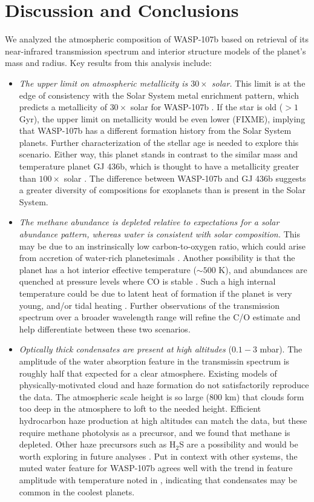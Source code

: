\documentclass[twocolumn]{aastex61}
\begin{document}
\section{Discussion and Conclusions} \label{sec:discuss}
We analyzed the atmospheric composition of WASP-107b based on retrieval of its near-infrared transmission spectrum and interior structure models of the planet's mass and radius.  Key results from this analysis include:

\begin{itemize}
\item{\emph{The upper limit on atmospheric metallicity is $30\times$ solar.} This limit is at the edge of consistency with the Solar System metal enrichment pattern, which predicts a metallicity of $30\times$ solar for WASP-107b \citep{kreidberg14b}.  If the star is old ($>1$ Gyr), the upper limit on metallicity would be even lower (FIXME), implying that WASP-107b has a different formation history from the Solar System planets. Further characterization of the stellar age is needed to explore this scenario.  Either way, this planet stands in contrast to the similar mass and temperature planet GJ 436b, which is thought to have a metallicity greater than $100\times$ solar \citep{moses13, morley17}. The difference between WASP-107b and GJ 436b suggests a greater diversity of compositions for exoplanets than is present in the Solar System.}
\item{\emph{The methane abundance is depleted relative to expectations for a solar abundance pattern, whereas water is consistent with solar composition.} This may be due to an instrinsically low carbon-to-oxygen ratio, which could arise from accretion of water-rich planetesimals \citep{mordasini16, espinoza17}.  Another possibility is that the planet has a hot interior effective temperature ($\sim500$ K), and abundances are quenched at pressure levels where CO is stable \citep[as observed in some directly imaged planets;][]{skemer14, zahnle14}. Such a high internal temperature could be due to latent heat of formation if the planet is very young, and/or tidal heating \citep{fortney08, morley17}. Further observations of the transmission spectrum over a broader wavelength range will refine the C/O estimate and help differentiate between these two scenarios.} 
\item{\emph{Optically thick condensates are present at high altitudes} ($0.1 - 3$ mbar). The amplitude of the water absorption feature in the transmissin spectrum is roughly half that expected for a clear atmosphere. Existing models of physically-motivated cloud and haze formation do not satisfactorily reproduce the data. The atmospheric scale height is so large (800 km) that clouds form too deep in the atmosphere to loft to the needed height. Efficient hydrocarbon haze production at high altitudes can match the data, but these require methane photolysis as a precursor, and we found that methane is depleted.  Other haze precursors such as H$_2$S are a possibility and would be worth exploring in future analyses \citep{zahnle09, gao17}. Put in context with other systems, the muted water feature for WASP-107b agrees well with the trend in feature amplitude with temperature noted in \cite{crossfield17}, indicating that condensates may be common in the coolest planets.}

\end{itemize}
\end{document}
